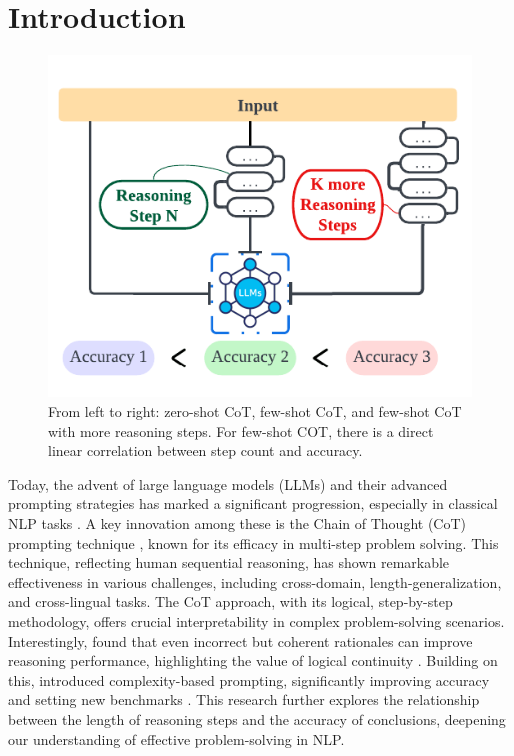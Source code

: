 \documentclass[11pt]{article}
\begin{document}
\section{Introduction}
\columnbreak
\begin{figure}[t]
    \centering
    \includegraphics[width=0.9\columnwidth]{add.pdf}
    \caption{From left to right: zero-shot CoT, few-shot CoT, and few-shot CoT with more reasoning steps. For few-shot COT, there is a direct linear correlation between step count and accuracy.}
    \label{fig:steps-connection-with-accuracy}
\end{figure}

Today, the advent of large language models (LLMs) and their advanced prompting strategies has marked a significant progression, especially in classical NLP tasks \cite{kojima2023large,wei2022chain,shao2023synthetic,lyu2023faithful, jin2024exploring}. A key innovation among these is the Chain of Thought (CoT) prompting technique \cite{kojima2023large,wang2023selfconsistency,zhang2022automatic}, known for its efficacy in multi-step problem solving. This technique, reflecting human sequential reasoning, has shown remarkable effectiveness in various challenges, including cross-domain, length-generalization, and cross-lingual tasks. The CoT approach, with its logical, step-by-step methodology, offers crucial interpretability in complex problem-solving scenarios. Interestingly, \citeauthor{wang2023selfconsistency} found that even incorrect but coherent rationales can improve reasoning performance, highlighting the value of logical continuity \cite{wang2023selfconsistency}. Building on this, \citeauthor{fu2023complexitybased} introduced complexity-based prompting, significantly improving accuracy and setting new benchmarks \cite{fu2023complexitybased}. This research further explores the relationship between the length of reasoning steps and the accuracy of conclusions, deepening our understanding of effective problem-solving in NLP.
\end{document}

